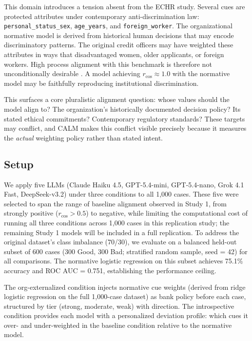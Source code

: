 \documentclass{article}
\begin{document}
This domain introduces a tension absent from the ECHR study. Several cues are protected attributes under contemporary anti-discrimination law: \texttt{personal\_status\_sex}, \texttt{age\_years}, and \texttt{foreign\_worker}. The organizational normative model is derived from historical human decisions that may encode discriminatory patterns. The original credit officers may have weighted these attributes in ways that disadvantaged women, older applicants, or foreign workers. High process alignment with this benchmark is therefore not unconditionally desirable \citep{selbst2019fairness,dolata2022sociotechnical}. A model achieving $r_{\cos} \approx 1.0$ with the normative model may be faithfully reproducing institutional discrimination.

This surfaces a core pluralistic alignment question: whose values should the model align to? The organization's historically documented decision policy? Its stated ethical commitments? Contemporary regulatory standards? These targets may conflict, and CALM makes this conflict visible precisely because it measures the \emph{actual} weighting policy rather than stated intent.

\subsection{Setup}

We apply five LLMs (Claude Haiku 4.5, GPT-5.4-mini, GPT-5.4-nano, Grok 4.1 Fast, DeepSeek-v3.2) under three conditions to all 1,000 cases. These five were selected to span the range of baseline alignment observed in Study 1, from strongly positive ($r_{\cos} > 0.5$) to negative, while limiting the computational cost of running all three conditions across 1,000 cases in this replication study; the remaining Study 1 models will be included in a full replication. To address the original dataset's class imbalance (70/30), we evaluate on a balanced held-out subset of 600 cases (300 Good, 300 Bad; stratified random sample, seed = 42) for all comparisons. The normative logistic regression on this subset achieves 75.1\% accuracy and ROC AUC = 0.751, establishing the performance ceiling.

The org-externalized condition injects normative cue weights (derived from ridge logistic regression on the full 1,000-case dataset) as bank policy before each case, structured by tier (strong, moderate, weak) with direction. The introspective condition provides each model with a personalized deviation profile: which cues it over- and under-weighted in the baseline condition relative to the normative model.
\end{document}
